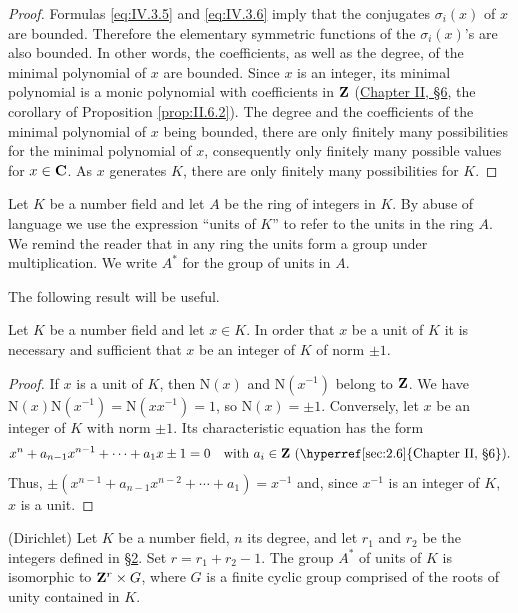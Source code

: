 \begin{proof}
Formulas \eqref{eq:IV.3.5} and \eqref{eq:IV.3.6} imply that the conjugates
$\sigma_{i}(x)$ of $x$ are bounded. Therefore the elementary symmetric
functions of the $\sigma_{i}(x)$'s are also bounded. In other words, the
coefficients, as well as the degree, of the minimal polynomial of $x$ are
bounded. Since $x$ is an integer, its minimal polynomial is a monic
polynomial with coefficients in $\mathbf{Z}$ (\hyperref[sec:2.6]{Chapter II, §6}, the corollary of
Proposition \ref{prop:II.6.2}). The degree and the coefficients of the
minimal polynomial of $x$ being bounded, there are only finitely many
possibilities for the minimal polynomial of $x$, consequently only finitely
many possible values for $x\in\mathbf{C}$. As $x$ generates $K$, there are only
finitely many possibilities for $K$.
\end{proof}


Let $K$ be a number field and let $A$ be the ring of integers in $K$. By
abuse of language we use the expression ``units of $K$'' to refer to the
units in the ring $A$. We remind the reader that in any ring the units form
a group under multiplication. We write $A^{*}$ for the group of units in
$A$.

The following result will be useful.

\begin{proposition}
\label{prop:IV.4.1}
Let $K$ be a number field and let $x\in K$. In order that $x$ be a unit of
$K$ it is necessary and sufficient that $x$ be an integer of $K$ of norm
$\pm1$.
\end{proposition}

\begin{proof}
If $x$ is a unit of $K$, then $\mathrm{N}(x)$ and $\mathrm{N}(x^{-1})$
belong to $\mathbf{Z}$. We have
$\mathrm{N}(x)\mathrm{N}(x^{-1})=\mathrm{N}(xx^{-1})=1$, so
$\mathrm{N}(x)=\pm1$. Conversely, let $x$ be an integer of $K$ with norm
$\pm1$. Its characteristic equation has the form
\[
x^{n}+a_{n-1}x^{n-1}+\cdots+a_{1}x\pm1=0
\quad\text{with }a_{i}\in\Z\ \text{(\hyperref[sec:2.6]{Chapter II, §6})}.
\]
Thus, $\pm(x^{n-1}+a_{n-1}x^{n-2}+\cdots+a_{1})=x^{-1}$ and, since
$x^{-1}$ is an integer of $K$, $x$ is a unit.
\end{proof}

\begin{theorem}
\label{thm:IV.4.1}
\textnormal{(Dirichlet)} Let $K$ be a number field, $n$ its degree, and let
$r_{1}$ and $r_{2}$ be the integers defined in \hyperref[sec:4.2]{§2}. Set
$r=r_{1}+r_{2}-1$. The group $A^{*}$ of units of $K$ is isomorphic to
$\mathbf{Z}^{r}\times G$, where $G$ is a finite cyclic group comprised of the roots
of unity contained in $K$.
\end{theorem}

